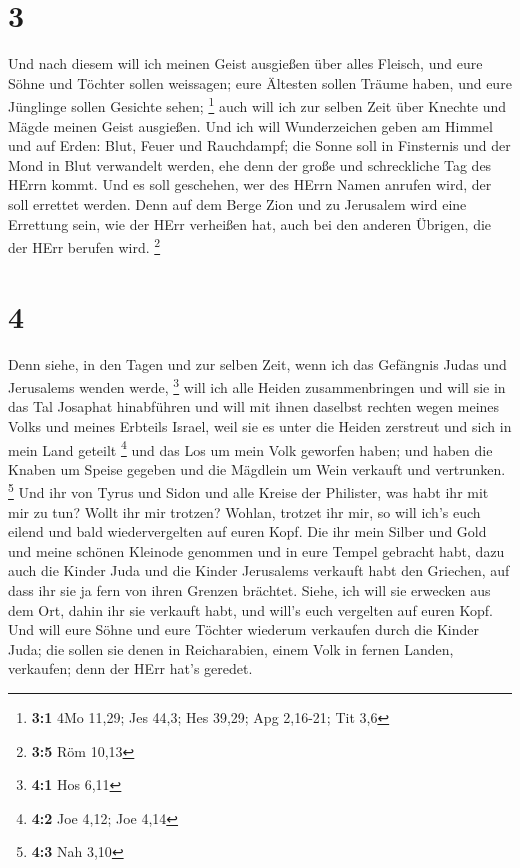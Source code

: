 \hypertarget{section-2}{%
\section{3}\label{section-2}}

 Und nach diesem will ich meinen Geist ausgießen über
alles Fleisch, und eure Söhne und Töchter sollen weissagen; eure
Ältesten sollen Träume haben, und eure Jünglinge sollen Gesichte sehen;
\footnote{\textbf{3:1} 4Mo 11,29; Jes 44,3; Hes 39,29; Apg 2,16-21; Tit
  3,6}  auch will ich zur selben Zeit über Knechte und
Mägde meinen Geist ausgießen.  Und ich will Wunderzeichen
geben am Himmel und auf Erden: Blut, Feuer und Rauchdampf;
 die Sonne soll in Finsternis und der Mond in Blut
verwandelt werden, ehe denn der große und schreckliche Tag des HErrn
kommt.  Und es soll geschehen, wer des HErrn Namen anrufen
wird, der soll errettet werden. Denn auf dem Berge Zion und zu Jerusalem
wird eine Errettung sein, wie der HErr verheißen hat, auch bei den
anderen Übrigen, die der HErr berufen wird. \footnote{\textbf{3:5} Röm
  10,13}

\hypertarget{section-3}{%
\section{4}\label{section-3}}

 Denn siehe, in den Tagen und zur selben Zeit, wenn ich
das Gefängnis Judas und Jerusalems wenden werde, \footnote{\textbf{4:1}
  Hos 6,11}  will ich alle Heiden zusammenbringen und will
sie in das Tal Josaphat hinabführen und will mit ihnen daselbst rechten
wegen meines Volks und meines Erbteils Israel, weil sie es unter die
Heiden zerstreut und sich in mein Land geteilt \footnote{\textbf{4:2}
  Joe 4,12; Joe 4,14}  und das Los um mein Volk geworfen
haben; und haben die Knaben um Speise gegeben und die Mägdlein um Wein
verkauft und vertrunken. \footnote{\textbf{4:3} Nah 3,10} 
Und ihr von Tyrus und Sidon und alle Kreise der Philister, was habt ihr
mit mir zu tun? Wollt ihr mir trotzen? Wohlan, trotzet ihr mir, so will
ich's euch eilend und bald wiedervergelten auf euren Kopf.
 Die ihr mein Silber und Gold und meine schönen Kleinode
genommen und in eure Tempel gebracht habt,  dazu auch die
Kinder Juda und die Kinder Jerusalems verkauft habt den Griechen, auf
dass ihr sie ja fern von ihren Grenzen brächtet.  Siehe,
ich will sie erwecken aus dem Ort, dahin ihr sie verkauft habt, und
will's euch vergelten auf euren Kopf.  Und will eure Söhne
und eure Töchter wiederum verkaufen durch die Kinder Juda; die sollen
sie denen in Reicharabien, einem Volk in fernen Landen, verkaufen; denn
der HErr hat's geredet.


